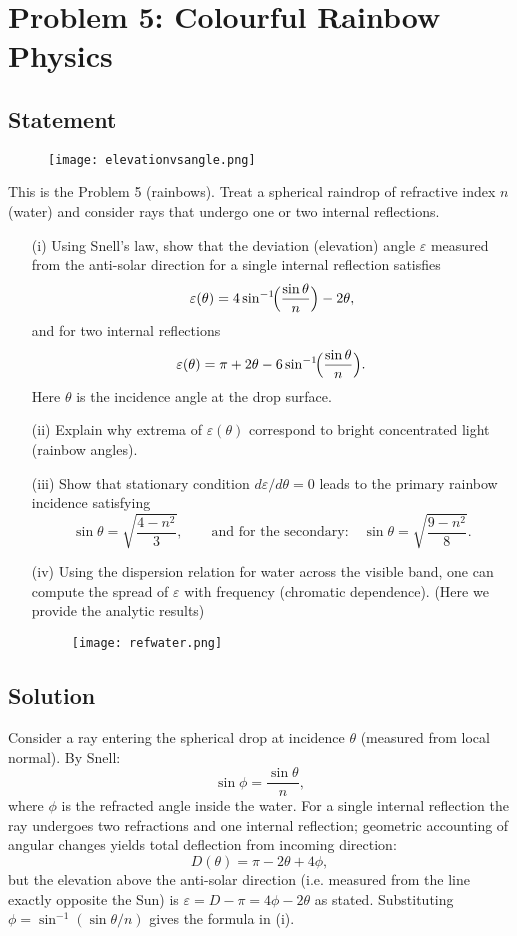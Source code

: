 \documentclass[12pt,a4paper]{article}
\begin{document}
\section{Problem 5: Colourful Rainbow Physics}
\subsection*{Statement }
\begin{figure}
  \texttt{[image: elevationvsangle.png]}
\end{figure}
This is the Problem 5 (rainbows). Treat a spherical raindrop of refractive index $n$ (water) and consider rays that undergo one or two internal reflections.
\begin{enumerate}[leftmargin=*]
  \item[(i)] Using Snell's law, show that the deviation (elevation) angle $\varepsilon$ measured from the anti-solar direction for a single internal reflection satisfies
  \[
    \varepsilon(\theta)=4\sin^{-1}\!\Bigl(\frac{\sin\theta}{n}\Bigr)-2\theta,
  \]
  and for two internal reflections
  \[
    \varepsilon(\theta)=\pi+2\theta-6\sin^{-1}\!\Bigl(\frac{\sin\theta}{n}\Bigr).
  \]
  Here $\theta$ is the incidence angle at the drop surface.
  \item[(ii)] Explain why extrema of $\varepsilon(\theta)$ correspond to bright concentrated light (rainbow angles).
  \item[(iii)] Show that stationary condition $d\varepsilon/d\theta=0$ leads to the primary rainbow incidence satisfying
  \[
    \sin\theta=\sqrt{\frac{4-n^2}{3}},\qquad\text{and for the secondary:}\quad
    \sin\theta=\sqrt{\frac{9-n^2}{8}}.
  \]
  \item[(iv)] Using the dispersion relation for water across the visible band, one can compute the spread of $\varepsilon$ with frequency (chromatic dependence). (Here we provide the analytic results)
\begin{figure}
  \texttt{[image: refwater.png]}
\end{figure}
\end{enumerate}

\subsection*{Solution}

Consider a ray entering the spherical drop at incidence $\theta$ (measured from local normal). By Snell:
\[
\sin\phi=\frac{\sin\theta}{n},
\]
where $\phi$ is the refracted angle inside the water. For a single internal reflection the ray undergoes two refractions and one internal reflection; geometric accounting of angular changes yields total deflection from incoming direction:
\[
D(\theta)=\pi-2\theta+4\phi,
\]
but the elevation above the anti-solar direction (i.e. measured from the line exactly opposite the Sun) is $\varepsilon=D-\pi=4\phi-2\theta$ as stated. Substituting $\phi=\sin^{-1}(\sin\theta/n)$ gives the formula in (i).
\end{document}

